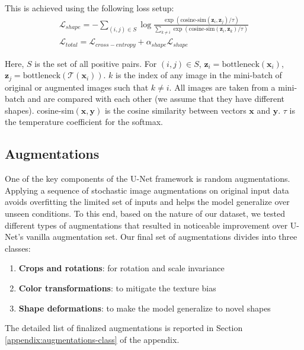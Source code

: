 This is achieved using the following loss setup:
\begin{gather}
    \mathcal{L}_{shape} = - \sum_{(i,j) \in S} \log \frac{\exp(\text{cosine-sim}(\mathbf{z}_i, \mathbf{z}_j) / \tau)}{\sum_{k \neq i} \exp(\text{cosine-sim}(\mathbf{z}_i, \mathbf{z}_k) / \tau)} \\
    \mathcal{L}_{total} = \mathcal{L}_{cross-entropy} + \alpha_{shape} \mathcal{L}_{shape} \label{eq:total-loss}
\end{gather}

Here, $S$ is the set of all positive pairs.
For $(i, j) \in S$, $\mathbf{z}_i = \text{bottleneck}(\mathbf{x}_i)$, $\mathbf{z}_j = \text{bottleneck}(\mathcal{T}(\mathbf{x}_i))$.
$k$ is the index of any image in the mini-batch of original or augmented images such that $k \neq i$.
All images are taken from a mini-batch and are compared with each other (we assume that they have different shapes).
cosine-sim$(\mathbf{x}, \mathbf{y})$ is the cosine similarity between vectors $\mathbf{x}$ and $\mathbf{y}$.
$\tau$ is the temperature coefficient for the softmax.


\subsection{Augmentations}
One of the key components of the U-Net framework is random augmentations.
Applying a sequence of stochastic image augmentations on original input data avoids overfitting the limited set of inputs and helps the model generalize over unseen conditions.
To this end, based on the nature of our dataset, we tested different types of augmentations that resulted in noticeable improvement over U-Net's vanilla augmentation set.
Our final set of augmentations divides into three classes:
\begin{enumerate}
    \item \textbf{Crops and rotations}: for rotation and scale invariance
    \item \textbf{Color transformations}: to mitigate the texture bias
    \item \textbf{Shape deformations}: to make the model generalize to novel shapes
\end{enumerate}
The detailed list of finalized augmentations is reported in Section \ref{appendix:augmentations-class} of the appendix.



